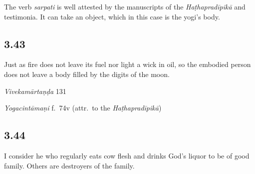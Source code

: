 \begin{ekdosis}
\begin{philcomm}[hp03_042]
The verb \emph{sarpati} is well attested by the manuscripts of the \emph{Haṭhapradīpikā} and testimonia. It can take an object, which in this case is the yogi's body.
\end{philcomm}

\subsection*{3.43}
\begin{translation}[hp03_043]
Just as fire does not leave its fuel nor light a wick in oil,
so the embodied person does not leave a body filled by the digits of the moon.
\end{translation}

\begin{sources}[hp03_043]
\emph{Vivekamārtaṇḍa} 131
\begin{versinnote}
\tl{\var{°vartiṃ ca ] °vartīva, °vartti ca \vl}\\!}
\end{versinnote}
\end{sources}

\begin{testimonia}[hp03_043]
\emph{Yogacintāmaṇi} f.~74v (attr.~to the \emph{Haṭhapradīpikā})
\begin{versinnote}
\end{versinnote}
\end{testimonia}


\subsection*{3.44}
\begin{translation}[hp03_044]
I consider he who regularly eats cow flesh and drinks God's liquor to be of good family. Others are destroyers of the family.
\end{translation}


\end{ekdosis}
